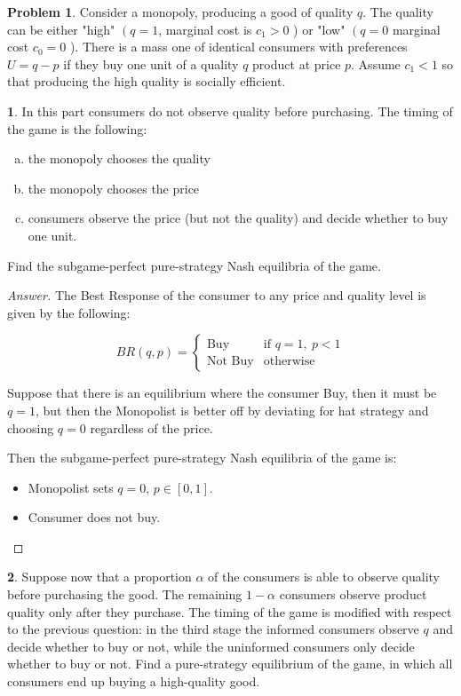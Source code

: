 \documentclass[12pt]{article}
\theoremstyle{definition}
\newtheorem{problem}{Problem}
\newtheorem{subproblem}{}[problem]
\begin{document}
\begin{problem}
Consider a monopoly, producing a good of quality $q .$ The quality can be either "high" $\left(q=1\right.$, marginal cost is $c_{1}>0$ ) or "low" $\left(q=0\right.$ marginal cost $c_{0}=0$ ). There is a mass one of identical consumers with preferences $U=q-p$ if they buy one unit of a quality $q$ product at price $p$. Assume $c_{1}<1$ so that producing the high quality is socially efficient.
\end{problem}
\begin{subproblem}
In this part consumers do not observe quality before purchasing. The timing of the game is the following:
\begin{enumerate}[(a)]
    \item the monopoly chooses the quality
    \item the monopoly chooses the price
    \item consumers observe the price (but not the quality) and decide whether to buy one unit.
\end{enumerate}

Find the subgame-perfect pure-strategy Nash equilibria of the game.
\end{subproblem}
\begin{proof}[Answer]
The Best Response of the consumer to any price and quality level is given by the following:

$$BR(q,p) = \left\{\begin{array}{cc}
    \text{Buy} & \text{if } q=1,\: p< 1  \\
    \text{Not Buy} &  \text{otherwise}
\end{array}\right.$$

Suppose that there is an equilibrium where the consumer Buy, then it must be $q=1$, but then the Monopolist is better off by deviating for hat strategy and choosing $q=0$ regardless of the price.

Then the subgame-perfect pure-strategy Nash equilibria of the game is:
\begin{itemize}
    \item Monopolist sets $q=0$, $p\in [0, 1]$.
    \item Consumer does not buy.
\end{itemize}

\end{proof}
\begin{subproblem}
 Suppose now that a proportion $\alpha$ of the consumers is able to observe quality before purchasing the good. The remaining $1-\alpha$ consumers observe product quality only after they purchase. The timing of the game is modified with respect to the previous question: in the third stage the informed consumers observe $q$ and decide whether to buy or not, while the uninformed consumers only decide whether to buy or not. Find a pure-strategy equilibrium of the game, in which all consumers end up buying a high-quality good.
\end{subproblem}
\end{document}
